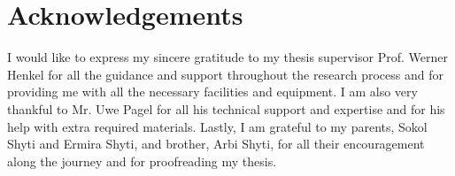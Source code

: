 \documentclass[a4paper,11pt,oneside]{article}
\begin{document}






  
  
  


  \newpage

  \section*{Acknowledgements}
  
  I would like to express my sincere gratitude to my thesis supervisor Prof. Werner Henkel for all the guidance and support throughout the research process and for providing me with all the necessary facilities and equipment. I am also very thankful to Mr. Uwe Pagel for all his technical support and expertise and for his help with extra required materials. Lastly, I am grateful to my parents, Sokol Shyti and Ermira Shyti, and brother, Arbi Shyti, for all their encouragement along the journey and for proofreading my thesis.  

  \newpage
  
  
\end{document}
